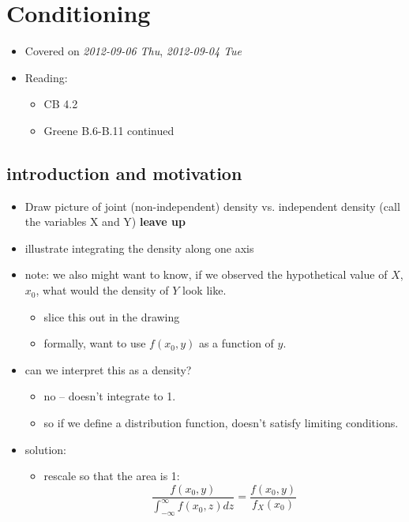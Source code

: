 
\chapter{Conditioning}

\begin{itemize}
\item Covered on \textit{2012-09-06 Thu}, \textit{2012-09-04 Tue}
\item Reading:
\begin{itemize}
\item CB 4.2
\item Greene B.6-B.11 continued
\end{itemize}
\end{itemize}
\section{introduction and motivation}
\label{sec-1}

\begin{itemize}
\item Draw picture of joint (non-independent) density vs. independent
      density (call the variables X and Y) \textbf{leave up}
\item illustrate integrating the density along one axis
\item note: we also might want to know, if we observed the hypothetical
      value of $X$, $x_0$, what would the density of $Y$ look like.
\begin{itemize}
\item slice this out in the drawing
\item formally, want to use $f(x_0, y)$ as a function of $y$.
\end{itemize}
\item can we interpret this as a density?
\begin{itemize}
\item no -- doesn't integrate to 1.
\item so if we define a distribution function, doesn't satisfy
        limiting conditions.
\end{itemize}
\item solution:
\begin{itemize}
\item rescale so that the area is 1:
        \[ \frac{f(x_0, y)}{\int_{-\infty}^{\infty} f(x_0, z) dz} =
        \frac{f(x_0, y)}{f_X(x_0)}\]
\end{itemize}
\end{itemize}
